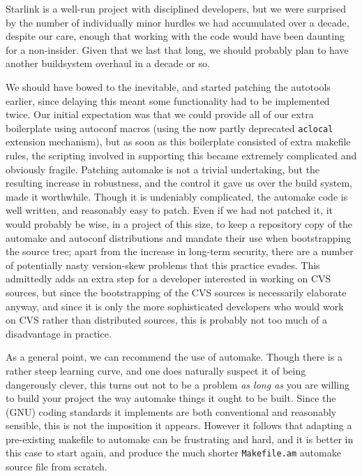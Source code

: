 \documentclass[11pt,twoside]{article}
\begin{document}
Starlink is a well-run project with disciplined developers, but we
were surprised by the number of individually minor hurdles we had
accumulated over a decade, despite our care, enough that working with
the code would have been daunting for a non-insider.  Given that we
last that long, we should probably plan to have another buildsystem
overhaul in a decade or so.

We should have bowed to the inevitable, and started patching the
autotools earlier, since delaying this meant some functionality had to be
implemented twice.  Our initial expectation was that we could provide
all of our extra boilerplate using autoconf macros (using the now
partly deprecated \texttt{aclocal} extension mechanism), but as soon as
this boilerplate consisted of extra makefile rules, the scripting
involved in supporting this became extremely complicated and obviously
fragile.  Patching automake is not a trivial undertaking, but the
resulting increase in robustness, and the control it gave us over the
build system, made it worthwhile.  Though it is undeniably
complicated, the automake code is well written, and reasonably easy to
patch.  Even if we had not patched it, it
would probably be wise, in a project of this size, to keep a
repository copy of the automake and autoconf distributions and mandate
their use when bootstrapping the source tree; apart from the increase
in long-term security, there are a number of potentially nasty
version-skew problems that this practice evades.  This admittedly adds
an extra step for a developer interested in working on CVS sources,
but since the bootstrapping of the CVS sources is necessarily
elaborate anyway, and since it is only the more sophisticated
developers who would work on CVS rather than distributed sources, this
is probably not too much of a disadvantage in practice.

As a general point, we can recommend the use of automake.  Though
there is a rather steep learning curve, and one does naturally suspect
it of being dangerously clever, this turns out not to be a problem
\emph{as long as} you are willing to build your project the way
automake things it ought to be built.  Since the (GNU) coding
standards it implements are both conventional and reasonably sensible,
this is not the imposition it appears.  However it follows that
adapting a pre-existing makefile to automake can be frustrating and
hard, and it is better in this case to start again, and produce the
much shorter \texttt{Makefile.am} automake source file from scratch.
\end{document}
